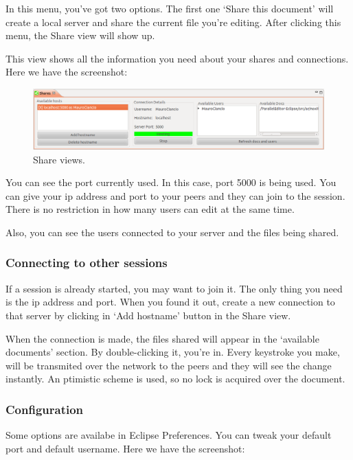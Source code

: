In this menu, you've got two options. The first one `Share this document' will create a local server 
and share the current file you're editing. After clicking this menu, the Share view will show up.

This view shows all the information you need about your shares and connections. Here we have the screenshot:
\begin{figure}[!ht]
	\begin{center}
		\includegraphics[width=14cm]{share.png}
		\caption{\label{share} Share views.}
	\end{center}
\end{figure}

You can see the port currently used. In this case, port 5000 is being used. You can give your ip address 
and port to your peers and they can join to the session. There is no restriction in how many users can 
edit at the same time.

Also, you can see the users connected to your server and the files being shared.

\subsubsection{Connecting to other sessions}
If a session is already started, you may want to join it. The only thing you need is the ip address and port.
 When you found it out, create a new connection to that server by clicking in `Add hostname' button in the 
 Share view.

When the connection is made, the files shared will appear in the `available documents' section. By 
double-clicking it, you're in.
Every keystroke you make, will be transmited over the network to the peers and they will see the change 
instantly. An ptimistic scheme is used, so no lock is acquired over the document.

\subsubsection{Configuration}
Some options are availabe in Eclipse Preferences. You can tweak your default port and default username.
Here we have the screenshot:

